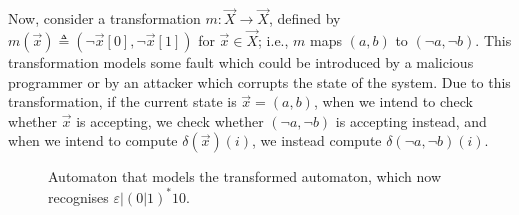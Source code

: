 Now, consider a transformation %
$m\colon \vec{X}\rightarrow\vec{X}$, defined by $m(\vec{x})\triangleq(\lnot \vec{x}[0],\lnot \vec{x}[1])$ for $\vec{x}\in \vec{X}$; i.e., $m$ maps $(a,b)$ to $(\lnot a, \lnot b)$. This transformation models some fault which could be introduced by a malicious programmer or by an attacker which corrupts the state of the system. Due to this transformation, %
if the current state is $\vec{x}=(a,b)$, when we intend to check whether $\vec{x}$ is accepting, we check whether $(\lnot a, \lnot b)$ is accepting instead, and when we intend to compute $\delta(\vec{x})(i)$, we instead compute $\delta(\lnot a, \lnot b)(i)$. 
\begin{figure}[t]
    \centering
{}
\caption{Automaton that models the transformed automaton, which now recognises $\varepsilon|(0|1)^*10$.}
\label{fig:Transformed}
\end{figure}


